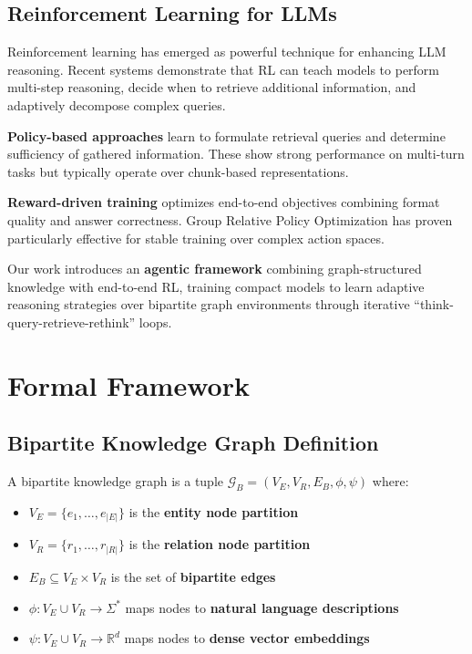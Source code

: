 \documentclass[11pt,a4paper]{article}
\begin{document}
\subsection{Reinforcement Learning for LLMs}

Reinforcement learning has emerged as powerful technique for enhancing LLM reasoning. Recent systems demonstrate that RL can teach models to perform multi-step reasoning, decide when to retrieve additional information, and adaptively decompose complex queries.

\textbf{Policy-based approaches} learn to formulate retrieval queries and determine sufficiency of gathered information. These show strong performance on multi-turn tasks but typically operate over chunk-based representations.

\textbf{Reward-driven training} optimizes end-to-end objectives combining format quality and answer correctness. Group Relative Policy Optimization has proven particularly effective for stable training over complex action spaces.

Our work introduces an \textbf{agentic framework} combining graph-structured knowledge with end-to-end RL, training compact models to learn adaptive reasoning strategies over bipartite graph environments through iterative ``think-query-retrieve-rethink'' loops.

\section{Formal Framework}

\subsection{Bipartite Knowledge Graph Definition}

\begin{definition}
A bipartite knowledge graph is a tuple $\mathcal{G}_B = (V_E, V_R, E_B, \phi, \psi)$ where:
\begin{itemize}
    \item $V_E = \{e_1, \ldots, e_{|E|}\}$ is the \textbf{entity node partition}
    \item $V_R = \{r_1, \ldots, r_{|R|}\}$ is the \textbf{relation node partition}
    \item $E_B \subseteq V_E \times V_R$ is the set of \textbf{bipartite edges}
    \item $\phi: V_E \cup V_R \rightarrow \Sigma^*$ maps nodes to \textbf{natural language descriptions}
    \item $\psi: V_E \cup V_R \rightarrow \mathbb{R}^d$ maps nodes to \textbf{dense vector embeddings}
\end{itemize}
\end{definition}
\end{document}
